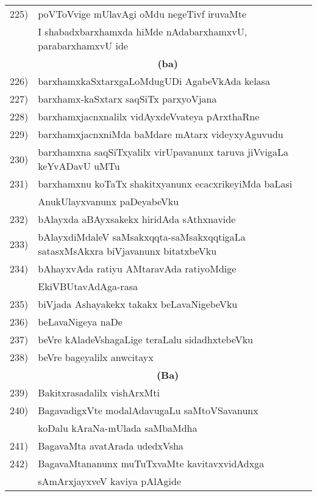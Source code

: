 {\begin{longtable}{@{}cp{7.4cm}r}
225) & poVToVvige mUlavAgi oMdu negeTivf iruvaMte  & \\
     & I shabadxbarxhamxda hiMde nAdabarxhamxvU, parabarxhamxvU ide & \pageref{page199}\\[0.4cm]
     &  \multicolumn{1}{c}{\textbf{(ba)}} & \\[0.4cm]
226) & barxhamxkaSxtarxgaLoMdugUDi AgabeVkAda kelasa & \pageref{page92}\\
227) & barxhamx-kaSxtarx saqSiTx parxyoVjana & \pageref{page91}\\
228) & barxhamxjacnxnalilx vidAyxdeVvateya pArxthaRne & \pageref{page85}\\
229) & barxhamxjacnxniMda baMdare mAtarx videyxyAguvudu & \pageref{page85}\\  
230) & barxhamxna saqSiTxyalilx virUpavanunx taruva jiVvigaLa keYvADavU uMTu & \pageref{page192}\\
231) & barxhamxnu koTaTx shakitxyanunx ecacxrikeyiMda baLasi & \\
     & AnukUlayxvanunx paDeyabeVku & \pageref{page193}\\
232) & bAlayxda aBAyxsakekx hiridAda sAthxnavide & \pageref{page213}\\
233) & bAlayxdiMdaleV saMsakxqqta-saMsakxqqtigaLa satasxMsAkxra biVjavanunx bitatxbeVku & \pageref{page53}\\
234) &  bAhayxvAda ratiyu AMtaravAda ratiyoMdige & \\
     & EkiVBUtavAdAga-rasa & \pageref{page228}\\
235) & biVjada Ashayakekx takakx beLavaNigebeVku & \pageref{page70}\\
236) & beLavaNigeya naDe & \pageref{page66}\\
237) & beVre kAladeVshagaLige teraLalu sidadhxtebeVku & \pageref{page126}\\
238) & beVre bageyalilx anwcitayx & \pageref{page117}\\[0.3cm]
     &  \multicolumn{1}{c}{\textbf{(Ba)}} & \\[0.3cm]
239) & Bakitxrasadalilx vishArxMti & \pageref{page231}\\
240) & BagavadigxVte modalAdavugaLu saMtoVSavanunx & \\
     & koDalu kAraNa-mUlada saMbaMdha & \pageref{page195}\\  
241) & BagavaMta avatArada udedxVsha & \pageref{page72}\\
242) & BagavaMtananunx muTuTxvaMte kavitavxvidAdxga & \\
     & sAmArxjayxveV kaviya pAlAgide & \pageref{page183}\\

\end{longtable}}
